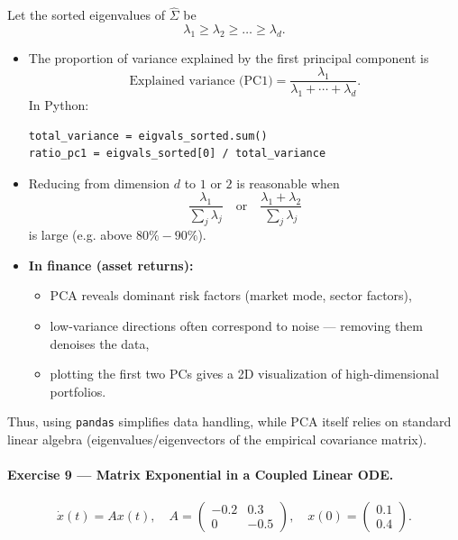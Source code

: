 \documentclass[11pt]{article}
\begin{document}
\begin{enumerate}
Let the sorted eigenvalues of $\widehat{\Sigma}$ be
\[
\lambda_1 \ge \lambda_2 \ge \dots \ge \lambda_d.
\]

\begin{itemize}
  \item The proportion of variance explained by the first principal component is
  \[
  \text{Explained variance (PC1)}
  = \frac{\lambda_1}{\lambda_1+\cdots+\lambda_d}.
  \]
  In Python:
\begin{verbatim}
total_variance = eigvals_sorted.sum()
ratio_pc1 = eigvals_sorted[0] / total_variance
\end{verbatim}

  \item Reducing from dimension $d$ to $1$ or $2$ is reasonable when
  \[
  \frac{\lambda_1}{\sum_j \lambda_j}
  \quad\text{or}\quad
  \frac{\lambda_1+\lambda_2}{\sum_j \lambda_j}
  \]
  is large (e.g. above \(80\%-90\%\)).

  \item \textbf{In finance (asset returns):}
  \begin{itemize}
    \item PCA reveals dominant risk factors (market mode, sector factors),
    \item low-variance directions often correspond to noise — removing them denoises the data,
    \item plotting the first two PCs gives a 2D visualization of high-dimensional portfolios.
  \end{itemize}
\end{itemize}

Thus, using \texttt{pandas} simplifies data handling, while PCA itself relies on standard linear algebra (eigenvalues/eigenvectors of the empirical covariance matrix).
\end{enumerate}
\bigskip

\paragraph{Exercise 9 — Matrix Exponential in a Coupled Linear ODE.}

\[
\dot{x}(t) = A x(t),\quad
A = \begin{pmatrix}-0.2 & 0.3\\ 0 & -0.5\end{pmatrix},\quad
x(0) = \begin{pmatrix}0.1\\0.4\end{pmatrix}.
\]
\end{document}
